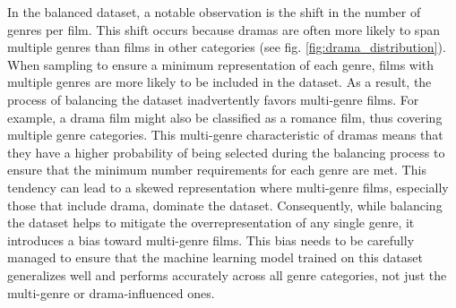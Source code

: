 \documentclass[a4paper, 11pt]{article}
\begin{document}
    In the balanced dataset, a notable observation is the shift in the number of genres per film. This shift occurs because dramas are often more likely to span multiple genres than films in other categories (see fig. \ref{fig:drama_distribution}).
    When sampling to ensure a minimum representation of each genre, films with multiple genres are more likely to be included in the dataset.
    As a result, the process of balancing the dataset inadvertently favors multi-genre films. For example, a drama film might also be classified as a romance film, thus covering multiple genre categories. This multi-genre characteristic of dramas means that they have a higher probability of being selected during the balancing process to ensure that the minimum number requirements for each genre are met.
    This tendency can lead to a skewed representation where multi-genre films, especially those that include drama, dominate the dataset. Consequently, while balancing the dataset helps to mitigate the overrepresentation of any single genre, it introduces a bias toward multi-genre films. This bias needs to be carefully managed to ensure that the machine learning model trained on this dataset generalizes well and performs accurately across all genre categories, not just the multi-genre or drama-influenced ones.
\end{document}
